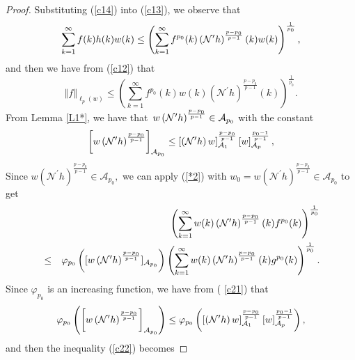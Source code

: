 \documentclass[a4paper]{amsart}
\theoremstyle{plain}
\numberwithin{equation}{section}
\begin{document}
\begin{proof}
Substituting (\ref{c14}) into (\ref{c13}), we observe that%
\begin{equation}
\sum_{k=1}^{\infty }f(k)h(k)w(k)\leq \left( \sum_{k=1}^{\infty
}f^{p_{0}}(k)\left( \mathcal{N}^{\prime }h\right) ^{\frac{p-p_{0}}{p-1}%
}(k)w(k)\right) ^{\frac{1}{p_{0}}},  \notag
\end{equation}%
and then we have from (\ref{c12}) that%
\begin{equation}
\left\Vert f\right\Vert _{\ell _{p}(w)}\leq \left( \sum_{k=1}^{\infty
}f^{p_{0}}(k)w(k)\left( \mathcal{N}^{\prime }h\right) ^{\frac{p-p_{0}}{p-1}%
}(k)\right) ^{\frac{1}{p_{0}}}.  \label{c15}
\end{equation}%
From Lemma \ref{L1*}, we have that\ $w\left( \mathcal{N}^{\prime }h\right) ^{%
\frac{p-p_{0}}{p-1}}\in \mathcal{A}_{p_{0}}$ with the constant%
\begin{equation}
\left[ w\left( \mathcal{N}^{\prime }h\right) ^{\frac{p-p_{0}}{p-1}}\right] _{%
\mathcal{A}_{p_{0}}}\leq \left[ \left( \mathcal{N}^{\prime }h\right) w\right]
_{\mathcal{A}_{1}}^{\frac{p-p_{0}}{p-1}}\left[ w\right] _{\mathcal{A}_{p}}^{%
\frac{p_{0}-1}{p-1}},  \label{c21}
\end{equation}%
Since $w\left( \mathcal{N}^{\prime }h\right) ^{\frac{p-p_{0}}{p-1}}\in 
\mathcal{A}_{p_{0}},$ we can apply (\ref{*2}) with $w_{0}=w\left( \mathcal{N}%
^{\prime }h\right) ^{\frac{p-p_{0}}{p-1}}\in \mathcal{A}_{p_{0}}$ to get%
\begin{eqnarray}
&&\left( \sum_{k=1}^{\infty }w(k)\left( \mathcal{N}^{\prime }h\right) ^{%
\frac{p-p_{0}}{p-1}}(k)f^{p_{0}}(k)\right) ^{\frac{1}{p_{0}}}  \notag \\
&\leq &\mathcal{\varphi }_{p_{0}}\left( [w\left( \mathcal{N}^{\prime
}h\right) ^{\frac{p-p_{0}}{p-1}}]_{\mathcal{A}_{p_{0}}}\right) \left(
\sum_{k=1}^{\infty }w(k)\left( \mathcal{N}^{\prime }h\right) ^{\frac{p-p_{0}%
}{p-1}}(k)g^{p_{0}}(k)\right) ^{\frac{1}{p_{0}}}.  \label{c22}
\end{eqnarray}%
Since $\mathcal{\varphi }_{p_{0}}$ is an increasing function, we have from (%
\ref{c21}) that%
\begin{equation}
\mathcal{\varphi }_{p_{0}}\left( \left[ w\left( \mathcal{N}^{\prime
}h\right) ^{\frac{p-p_{0}}{p-1}}\right] _{\mathcal{A}_{p_{0}}}\right) \leq 
\mathcal{\varphi }_{p_{0}}\left( \left[ \left( \mathcal{N}^{\prime }h\right)
w\right] _{\mathcal{A}_{1}}^{\frac{p-p_{0}}{p-1}}\left[ w\right] _{\mathcal{A%
}_{p}}^{\frac{p_{0}-1}{p-1}}\right) ,  \notag
\end{equation}%
and then the inequality (\ref{c22}) becomes 

\end{proof}
\end{document}
